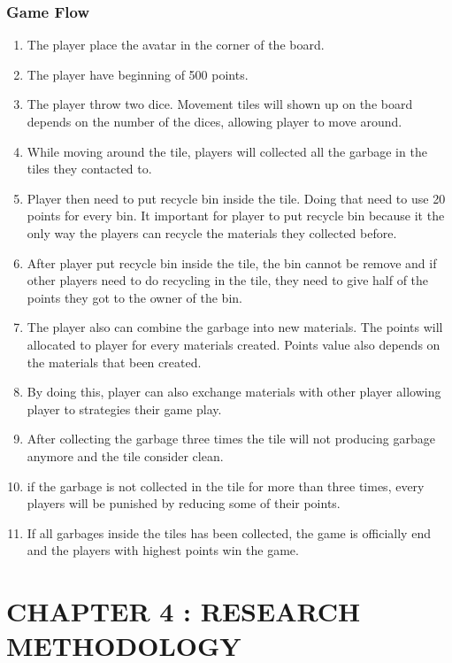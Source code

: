\documentclass[12pt]{article}
\begin{document}
\subsubsection{Game Flow}
\begin{enumerate}
    \item The player place the avatar in the corner of the board.
    \item The player have beginning of 500 points.
    \item The player throw two dice. Movement tiles will shown up on the board depends on the number of the dices, allowing player to move around.
    \item While moving around the tile, players will collected all the garbage in the tiles they contacted to. 
    \item Player then need to put recycle bin inside the tile. Doing that need to use 20 points for every bin. It important for player to put recycle bin because it the only way the players can recycle the materials they collected before. 
    \item After player put recycle bin inside the tile, the bin cannot be remove and if other players need to do recycling in the tile, they need to give half of the points they got to the owner of the bin.
    \item The player also can combine the garbage into new materials. The points will allocated to player for every materials created. Points value also depends on the materials that been created.
    \item By doing this, player can also exchange materials with other player allowing player to strategies their game play.
    \item After collecting the garbage three times the tile will not producing garbage anymore and the tile consider clean.
    \item if the garbage is not collected in the tile for more than three times, every players will be punished by reducing some of their points. 
    \item If all garbages inside the tiles has been collected, the game is officially end and the players with highest points win the game.
\end{enumerate}


\pagebreak

\section{CHAPTER 4 : RESEARCH METHODOLOGY}
\end{document}
